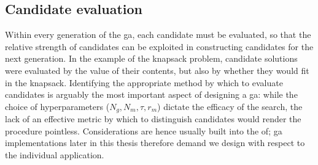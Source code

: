 \subsection{Candidate evaluation}
\label{sec:candidate_evaluation}
Within every generation of the \gls{ga}, each candidate must be evaluated, 
    so that the relative strength of candidates can be exploited in constructing 
    candidates for the next generation.
In the example of the knapsack problem, candidate solutions were evaluated by the value of their contents, 
    but also by whether they would fit in the knapsack. 
Identifying the appropriate method by which to evaluate candidates is arguably the most important aspect of designing a \gls{ga}:
    while the choice of hyperparameters ($N_g, N_m, \tau, r_m$) dictate the efficacy of the search, 
    the lack of an effective metric by which to distinguish candidates would render the procedure pointless.
Considerations are hence usually built into the \acrlong{of};
    \gls{ga} implementations later in this thesis therefore demand we design  
    with respect to the individual application. 
\par 




